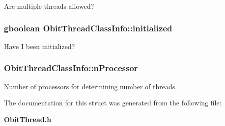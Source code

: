 Are multiple threads allowed? 

\subsubsection{\setlength{\rightskip}{0pt plus 5cm}gboolean {\bf Obit\-Thread\-Class\-Info::initialized}}\label{structObitThreadClassInfo_o0}


Have I been initialized? 

\subsubsection{ {\bf Obit\-Thread\-Class\-Info::n\-Processor}}\label{structObitThreadClassInfo_o2}


Number of processors for determining number of threads. 



The documentation for this struct was generated from the following file:\begin{CompactItemize}
\item 
{\bf Obit\-Thread.h}\end{CompactItemize}
